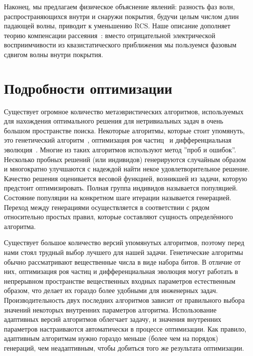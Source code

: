 Наконец, мы предлагаем физическое объяснение явлений: разность фаз
волн, распространяющихся внутри и снаружи покрытия, будучи целым
числом длин падающей волны, приводит к уменьшению RCS. Наше описание
дополняет теорию компенсации рассеяния~\cite{alu}: вместо
отрицательной электрической восприимчивости из квазистатического
приближения мы пользуемся фазовым сдвигом волны внутри
покрытия.

\section{Подробности оптимизации}
Существует огромное количество метаэвристических алгоритмов,
используемых для нахождения оптимального решения для нетривиальных
задач в очень большом пространстве поиска. Некоторые алгоритмы,
которые стоит упомянуть, это генетический
алгоритм~\cite{Goldberg-GA-1989}, оптимизация роя
частиц~\cite{Kennedy-PSO-1995} и дифференциальная
эволюция~\cite{Storn-DE-first-1997}. Многие из таких алгоритмов
используют метод ''проб и ошибок''. Несколько пробных решений (или
индивидов) генерируются случайным образом и многократно улучшаются с
надеждой найти некое удовлетворительное решение. Качество решения
оценивается весовой функцией, возникшей из задачи, которую предстоит
оптимизировать. Полная группа индивидов называется
популяцией. Состояние популяции на конкретном шаге итерации называется
генерацией. Переход между генерациями осуществляется в соответствии с
рядом относительно простых правил, которые составляют сущность
определённого алгоритма.


Существует большое количество версий упомянутых алгоритмов, поэтому
перед нами стоял трудный выбор лучшего для нашей задачи. Генетические
алгоритмы обычно рассматривают вещественные числа в виде набора
битов. В отличие от них, оптимизация роя частиц и дифференциальная
эволюция могут работать в непрерывном пространстве вещественных
входных параметров естественным образом, что делает их гораздо более
удобными для инженерных задач. Производительность двух последних
алгоритмов зависит от правильного выбора значений некоторых внутренних
параметров алгоритма. Использование адаптивных версий алгоритмов
облегчает задачу, и значения внутренних параметров настраиваются
автоматически в процессе оптимизации. Как правило, адаптивным
алгоритмам нужно гораздо меньше (более чем на порядок) генераций, чем
неадаптивным, чтобы добиться того же результата
оптимизации.~\cite{Jingqiao-JADE-2009,Zhan-APSO-2009}


